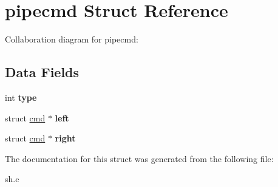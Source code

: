 \hypertarget{structpipecmd}{}\section{pipecmd Struct Reference}
\label{structpipecmd}


Collaboration diagram for pipecmd\+:
\subsection*{Data Fields}
\begin{DoxyCompactItemize}
\item 
int {\bfseries type}\hypertarget{structpipecmd_a75d1d90b6721ac025c0062ec0947aaea}{}\label{structpipecmd_a75d1d90b6721ac025c0062ec0947aaea}

\item 
struct \hyperlink{structcmd}{cmd} $\ast$ {\bfseries left}\hypertarget{structpipecmd_a8922b7eac1f12f729cc7226b8b120f6f}{}\label{structpipecmd_a8922b7eac1f12f729cc7226b8b120f6f}

\item 
struct \hyperlink{structcmd}{cmd} $\ast$ {\bfseries right}\hypertarget{structpipecmd_a882e2847aa340ae4e201d2e49921b47e}{}\label{structpipecmd_a882e2847aa340ae4e201d2e49921b47e}

\end{DoxyCompactItemize}


The documentation for this struct was generated from the following file\+:\begin{DoxyCompactItemize}
\item 
sh.\+c\end{DoxyCompactItemize}
